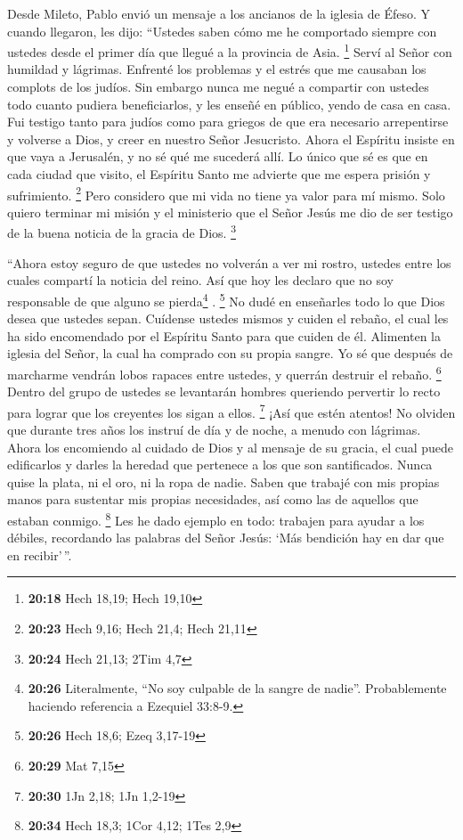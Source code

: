  Desde Mileto, Pablo envió un mensaje a los ancianos de
la iglesia de Éfeso.  Y cuando llegaron, les dijo:
``Ustedes saben cómo me he comportado siempre con ustedes desde el
primer día que llegué a la provincia de Asia. \footnote{\textbf{20:18}
  Hech 18,19; Hech 19,10}  Serví al Señor con humildad y
lágrimas. Enfrenté los problemas y el estrés que me causaban los
complots de los judíos.  Sin embargo nunca me negué a
compartir con ustedes todo cuanto pudiera beneficiarlos, y les enseñé en
público, yendo de casa en casa.  Fui testigo tanto para
judíos como para griegos de que era necesario arrepentirse y volverse a
Dios, y creer en nuestro Señor Jesucristo.  Ahora el
Espíritu insiste en que vaya a Jerusalén, y no sé qué me sucederá allí.
 Lo único que sé es que en cada ciudad que visito, el
Espíritu Santo me advierte que me espera prisión y sufrimiento.
\footnote{\textbf{20:23} Hech 9,16; Hech 21,4; Hech 21,11}
 Pero considero que mi vida no tiene ya valor para mí
mismo. Solo quiero terminar mi misión y el ministerio que el Señor Jesús
me dio de ser testigo de la buena noticia de la gracia de Dios.
\footnote{\textbf{20:24} Hech 21,13; 2Tim 4,7}

 ``Ahora estoy seguro de que ustedes no volverán a ver mi
rostro, ustedes entre los cuales compartí la noticia del reino.
 Así que hoy les declaro que no soy responsable de que
alguno se pierda\footnote{\textbf{20:26} Literalmente, ``No soy culpable
  de la sangre de nadie''. Probablemente haciendo referencia a Ezequiel
  33:8-9.} . \footnote{\textbf{20:26} Hech 18,6; Ezeq 3,17-19}
 No dudé en enseñarles todo lo que Dios desea que ustedes
sepan.  Cuídense ustedes mismos y cuiden el rebaño, el
cual les ha sido encomendado por el Espíritu Santo para que cuiden de
él. Alimenten la iglesia del Señor, la cual ha comprado con su propia
sangre.  Yo sé que después de marcharme vendrán lobos
rapaces entre ustedes, y querrán destruir el rebaño. \footnote{\textbf{20:29}
  Mat 7,15}  Dentro del grupo de ustedes se levantarán
hombres queriendo pervertir lo recto para lograr que los creyentes los
sigan a ellos. \footnote{\textbf{20:30} 1Jn 2,18; 1Jn 1,2-19}
 ¡Así que estén atentos! No olviden que durante tres años
los instruí de día y de noche, a menudo con lágrimas. 
Ahora los encomiendo al cuidado de Dios y al mensaje de su gracia, el
cual puede edificarlos y darles la heredad que pertenece a los que son
santificados.  Nunca quise la plata, ni el oro, ni la
ropa de nadie.  Saben que trabajé con mis propias manos
para sustentar mis propias necesidades, así como las de aquellos que
estaban conmigo. \footnote{\textbf{20:34} Hech 18,3; 1Cor 4,12; 1Tes 2,9}
 Les he dado ejemplo en todo: trabajen para ayudar a los
débiles, recordando las palabras del Señor Jesús: `Más bendición hay en
dar que en recibir'\,''.

